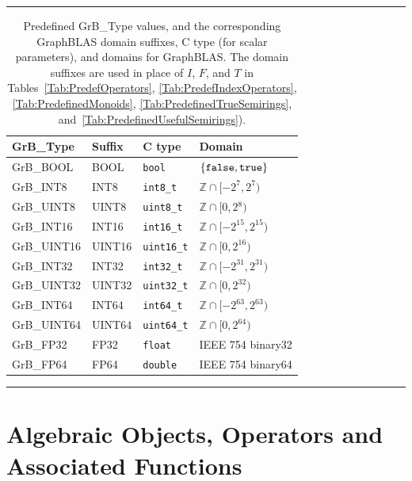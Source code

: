 \begin{table}
\hrule
\begin{center}
\caption[Predefined {\sf GrB\_Type} values.]{Predefined {\sf GrB\_Type} values, and the corresponding GraphBLAS domain 
suffixes, C type (for scalar parameters), and domains for GraphBLAS.  The domain
suffixes are used in place of $I$, $F$, and $T$ in 
Tables~\ref{Tab:PredefOperators}, \ref{Tab:PredefIndexOperators}, 
\ref{Tab:PredefinedMonoids}, \ref{Tab:PredefinedTrueSemirings}, 
and~\ref{Tab:PredefinedUsefulSemirings}).}
\label{Tab:PredefinedTypes}
\label{Tab:PredefinedDomains}

\vspace{1\baselineskip}
\begin{tabular}{l|l|l|l}
{\sf GrB\_Type}   & Suffix       & C type          & Domain \\
\hline
{\sf GrB\_BOOL}   & {\sf BOOL}   & {\tt bool}      & $\{ {\tt false}, {\tt true} \}$  \\
{\sf GrB\_INT8}   & {\sf INT8}   & {\tt int8\_t}   & $\mathbb{Z} \cap [-2^{7},2^{7})$  \\
{\sf GrB\_UINT8}  & {\sf UINT8}  & {\tt uint8\_t}  & $\mathbb{Z} \cap [0,2{^8})$  \\
{\sf GrB\_INT16}  & {\sf INT16}  & {\tt int16\_t}  & $\mathbb{Z} \cap [-2^{15},2^{15})$ \\
{\sf GrB\_UINT16} & {\sf UINT16} & {\tt uint16\_t} & $\mathbb{Z} \cap [0,2^{16})$ \\
{\sf GrB\_INT32}  & {\sf INT32}  & {\tt int32\_t}  & $\mathbb{Z} \cap [-2^{31},2^{31})$ \\
{\sf GrB\_UINT32} & {\sf UINT32} & {\tt uint32\_t} & $\mathbb{Z} \cap [0,2^{32})$ \\
{\sf GrB\_INT64}  & {\sf INT64}  & {\tt int64\_t}  & $\mathbb{Z} \cap [-2^{63},2^{63})$ \\
{\sf GrB\_UINT64} & {\sf UINT64} & {\tt uint64\_t} & $\mathbb{Z} \cap [0,2^{64})$ \\
{\sf GrB\_FP32}   & {\sf FP32}   & {\tt float}     & IEEE 754 {\sf binary32}  \\
{\sf GrB\_FP64}   & {\sf FP64}   & {\tt double}    & IEEE 754 {\sf binary64}  
\end{tabular}
\end{center}
\hrule
\end{table}

\section{Algebraic Objects, Operators and Associated Functions}

